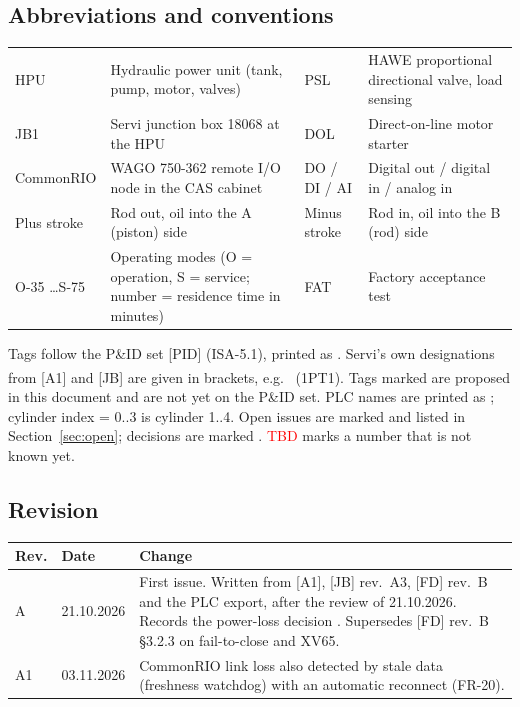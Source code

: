 \documentclass[11pt,a4paper]{article}
\newcommand{\prop}{\textsuperscript{\dag}}  %
\newcommand{\TBD}{\textcolor{red}{TBD}}
\begin{document}
\subsection{Abbreviations and conventions}
\begin{small}
\begin{tabularx}{\textwidth}{@{}lL@{\hspace{6mm}}lL@{}}
\toprule
HPU & Hydraulic power unit (tank, pump, motor, valves) & PSL & HAWE proportional directional valve, load sensing \\
JB1 & Servi junction box 18068 at the HPU & DOL & Direct-on-line motor starter \\
CommonRIO & WAGO 750-362 remote I/O node in the CAS cabinet & DO / DI / AI & Digital out / digital in / analog in \\
Plus stroke & Rod out, oil into the A (piston) side & Minus stroke & Rod in, oil into the B (rod) side \\
O-35 \dots S-75 & Operating modes (O = operation, S = service; number = residence time in minutes) & FAT & Factory acceptance test \\
\bottomrule
\end{tabularx}
\end{small}

Tags follow the P\&ID set [PID] (ISA-5.1), printed as . Servi's own designations from
[A1] and [JB] are given in brackets, e.g.\  (1PT1). Tags marked \prop{} are proposed in
this document and are not yet on the P\&ID set. PLC names are printed as ;
cylinder index  = 0..3 is cylinder 1..4. Open issues are marked  and listed in
Section~\ref{sec:open}; decisions are marked . \TBD{} marks a number that is not known yet.

\subsection{Revision}
\begin{small}
\begin{tabularx}{\textwidth}{@{}llL@{}}
\toprule
Rev. & Date & Change \\
\midrule
A & 21.10.2026 & First issue. Written from [A1], [JB] rev.~A3, [FD] rev.~B and the PLC export, after the review of 21.10.2026.
  Records the power-loss decision . Supersedes [FD] rev.~B §3.2.3 on fail-to-close and XV65. \\
A1 & 03.11.2026 & CommonRIO link loss also detected by stale data (freshness watchdog) with an automatic
  reconnect (FR-20). \\
\bottomrule
\end{tabularx}
\end{small}
\end{document}
